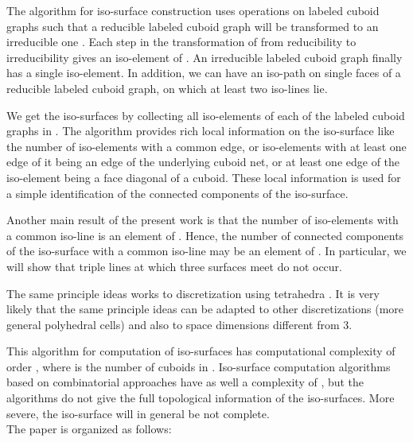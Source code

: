 \documentclass[a4paper,11pt]{article}
\begin{document}
The algorithm for iso-surface construction uses operations on labeled cuboid graphs such
that a reducible labeled cuboid graph  will be transformed to an irreducible one
. Each step in the transformation of  from reducibility to irreducibility
gives an iso-element of . An irreducible labeled cuboid graph finally has a single iso-element.
In addition, we can have an iso-path on single faces of a reducible labeled cuboid graph, on
which at least two iso-lines lie.

We get the iso-surfaces by collecting all iso-elements of each of the labeled cuboid graphs in
. The algorithm provides rich local information on the iso-surface like the number of
iso-elements with a common edge, or iso-elements with at least one edge of it being an edge of the
underlying cuboid net, or at least one edge of the iso-element being a face diagonal
of a cuboid. These local information is used for a simple identification of the connected components
of the iso-surface.

Another main result of the present work is that the number  of iso-elements with a
common iso-line is an element of . Hence, the number of connected components of the
iso-surface with a common iso-line may be an element of . In particular, we will show
that triple lines at which three surfaces meet do not occur.

The same principle ideas works to discretization using tetrahedra \cite{second-article-ali-bothe}.
It is very likely that the same principle ideas can be adapted to other discretizations (more
general polyhedral cells) and also to space dimensions different from 3.

This algorithm for computation of iso-surfaces has computational complexity of order , where  is
the number of cuboids in . Iso-surface computation algorithms based on
combinatorial approaches have as well a complexity of , but the algorithms do not give the full
topological information of the iso-surfaces. More severe, the iso-surface will in general be not complete.\\

\vspace{-0.3cm}
\noindent The paper is organized as follows:\\
\vspace{-0.3cm}
\end{document}
